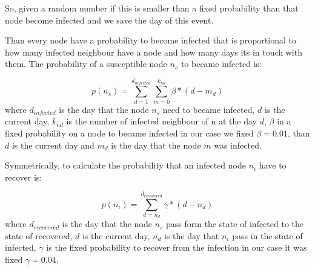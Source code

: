         So, given a random number if this is smaller than a fixed probability than that node become infected and we save the day of this event.
        
        Than every node have a probability to become infected that is proportional to how many infected neighbour have a node and how many days its in touch with them.
        The probability of a susceptible node $n_s$ to became infected is:
        
        \begin{equation}
            p(n_s) = \sum_{d=1}^{d_{infected}}{\sum_{m = 0}^{k_{nd}}{\beta * (d - m_d)}}
        \end{equation}
        where $d_{infected}$ is the day that the node $n_s$ need to became infected, $d$ is the current day, $k_{nd}$ is the number of infected neighbour of n at the day $d$, $\beta$ in a fixed probability on a node to became infected in our case we fixed $\beta=0.01$, than $d$ is the current day and $m_d$ is the day that the node $m$ was infected.
        
        Symmetrically, to calculate the probability that an infected node $n_i$ have to recover is:
        
        \begin{equation}
            p(n_i) = \sum_{d=n_d}^{d_{recovered}}{\gamma * (d - n_d)}
        \end{equation}
        where $d_{recovered}$ is the day that the node $n_s$ pass form the state of infected to the state of recovered, $d$ is the current day, $n_d$ is the day that $n_i$ pass in the state of infected, $\gamma$ is the fixed probability to recover from the infection in our case it was fixed $\gamma=0.04$. 